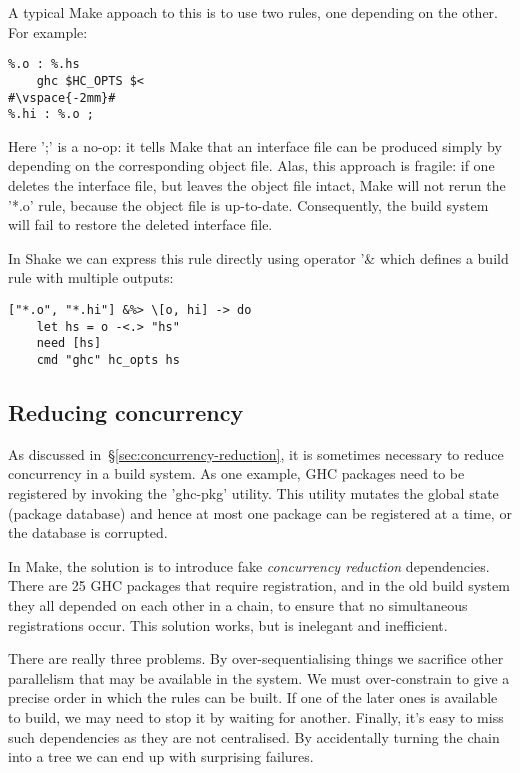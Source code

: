 A typical Make appoach to this is to use two rules, one depending on the other.
For example:

\begin{lstlisting}
%.o : %.hs
    ghc $HC_OPTS $<
#\vspace{-2mm}#
%.hi : %.o ;
\end{lstlisting}
\noindent Here \lst';' is a no-op: it tells Make that an interface file can be
produced simply by depending on the corresponding object file. Alas, this
approach is fragile: if one deletes the interface file, but leaves the object
file intact, Make will not rerun the \lst'*.o' rule, because the object file is
up-to-date. Consequently, the build system will fail to restore the deleted
interface file.

In Shake we can express this rule directly using operator \lst'&%
which defines a build rule with multiple outputs:


\begin{lstlisting}
["*.o", "*.hi"] &%> \[o, hi] -> do
    let hs = o -<.> "hs"
    need [hs]
    cmd "ghc" hc_opts hs
\end{lstlisting}

\subsection{Reducing concurrency\label{sec:ghc-pkg-db}}

As discussed in~\S\ref{sec:concurrency-reduction}, it is sometimes necessary to
reduce concurrency in a build system. As one example, GHC packages need to
be registered by invoking the \lst'ghc-pkg' utility. This utility mutates the
global state (package database) and hence at most one package can be registered
at a time, or the database is corrupted.

In Make, the solution is to introduce fake \emph{concurrency
reduction} dependencies. There are 25 GHC packages that require registration,
and in the old build system they all depended on each other in a chain, to
ensure that no simultaneous registrations occur. This solution works, but is
inelegant and inefficient.

There are really three problems. By over-sequentialising things we sacrifice
other parallelism that may be available in the system. We must over-constrain to
give a precise order in which the rules can be built. If one of the later ones
is available to build, we may need to stop it by waiting for another. Finally,
it's easy to miss such dependencies as they are not centralised. By accidentally
turning the chain into a tree we can end up with surprising failures.

